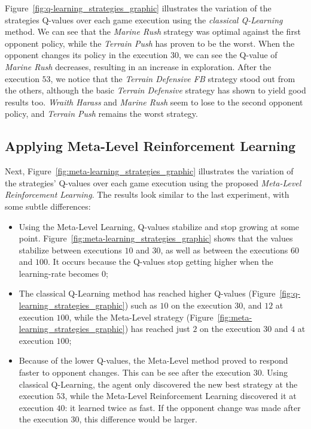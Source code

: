 Figure~\ref{fig:q-learning_strategies_graphic} illustrates the variation of the strategies Q-values over each game execution using the \textit{classical Q-Learning} method.
We can see that the \textit{Marine Rush} strategy was optimal against the first opponent policy, 
while the \textit{Terrain Push} has proven to be the worst.
When the opponent changes its policy in the execution $30$, we can see the Q-value of \textit{Marine Rush} decreases,
resulting in an increase in exploration. 
After the execution $53$, we notice that the \textit{Terrain Defensive FB} strategy stood out from the others, although the basic \textit{Terrain Defensive} strategy has shown to yield good results too. 
\textit{Wraith Harass} and \textit{Marine Rush} seem to lose to the second opponent policy, 
and \textit{Terrain Push} remains the worst strategy. 



\subsection{Applying Meta-Level Reinforcement Learning}
\label{subsec:applying_mlrl}

Next, Figure~\ref{fig:meta-learning_strategies_graphic} illustrates the variation of the strategies' Q-values over each game execution using the proposed \textit{Meta-Level Reinforcement Learning}.
The results look similar to the last experiment, with some subtle differences: 

\begin{itemize}
\item Using the Meta-Level Learning, Q-values stabilize and stop growing at some point. Figure~\ref{fig:meta-learning_strategies_graphic} shows that the values stabilize between executions $10$ and $30$, as well as between the executions $60$ and $100$. It occurs because the Q-values stop getting higher when the learning-rate becomes $0$;

\item The classical Q-Learning method has reached higher Q-values (Figure~\ref{fig:q-learning_strategies_graphic}) such as $10$ on the execution $30$, and $12$ at execution $100$, while the Meta-Level strategy (Figure~\ref{fig:meta-learning_strategies_graphic}) has reached just $2$ on the execution $30$ and $4$ at execution $100$;

\item Because of the lower Q-values, the Meta-Level method proved to respond faster to opponent changes. This can be see after the execution $30$. Using classical Q-Learning, the agent only discovered the new best strategy at the execution $53$, while the Meta-Level Reinforcement Learning discovered it at execution $40$: it learned twice as fast. If the opponent change was made after the execution $30$, this difference would be larger.
\end{itemize}

